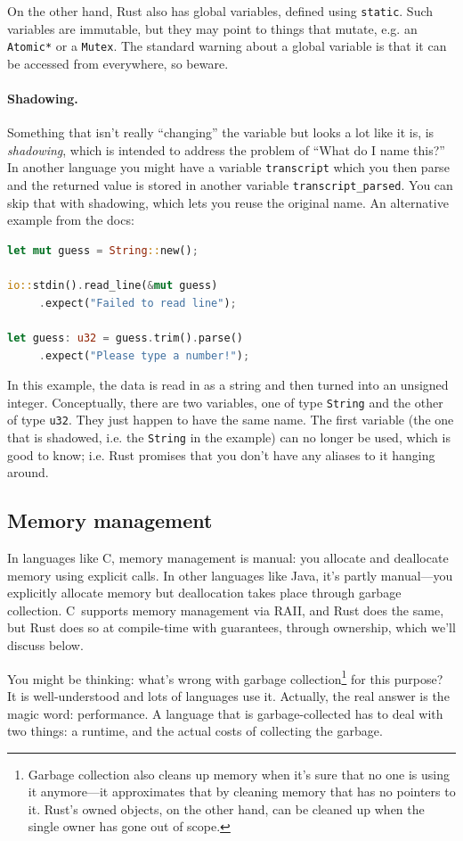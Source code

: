 \documentclass[a4paper]{report}
\newcommand{\CPP}{C\nolinebreak\hspace{-.05em}\raisebox{.4ex}{\tiny\bf +}\nolinebreak\hspace{-.10em}\raisebox{.4ex}{\tiny\bf +}}
\def\CPP{{C\nolinebreak[4]\hspace{-.05em}\raisebox{.4ex}{\tiny\bf ++}}}
\begin{document}
On the other hand, Rust also has global variables, defined using \texttt{static}. Such variables are immutable, but they may point to things that mutate, e.g. an \texttt{Atomic*} or a \texttt{Mutex}. The standard warning about a global variable is that it can be accessed from everywhere, so beware.

\paragraph{Shadowing.}
Something that isn't really ``changing'' the variable but looks a lot like it is, is \textit{shadowing}, which is intended to address the problem of ``What do I name this?'' In another language you might have a variable \texttt{transcript} which you then parse and the returned value is stored in another variable \texttt{transcript\_parsed}. You can skip that with shadowing, which lets you reuse the original name. An alternative example from the docs:

\begin{lstlisting}[language=Rust]
let mut guess = String::new();

io::stdin().read_line(&mut guess)
     .expect("Failed to read line");

let guess: u32 = guess.trim().parse()
     .expect("Please type a number!");
\end{lstlisting}

In this example, the data is read in as a string and then turned into an unsigned integer. Conceptually, there are two variables, one of type \texttt{String} and the other of type \texttt{u32}. They just happen to have the same name. The first variable (the one that is shadowed, i.e. the \texttt{String} in the example) can no longer be used, which is good to know; i.e. Rust promises that you don't have any aliases to it hanging around.

\subsection*{Memory management}
In languages like C, memory management is manual: you allocate and deallocate memory using explicit calls. In other languages like Java, it's partly manual---you explicitly allocate memory but deallocation takes place through garbage collection. \CPP~supports memory management via RAII, and Rust does the same, but Rust does so at compile-time with guarantees, through ownership, which we'll discuss below.

You might be thinking: what's wrong with garbage collection\footnote{Garbage collection also cleans up memory when it's sure that no one is using it anymore---it approximates that by cleaning memory that has no pointers to it. Rust's owned objects, on the other hand, can be cleaned up when the single owner has gone out of scope.} for this purpose? It is well-understood and lots of languages use it. Actually, the real answer is the magic word: performance. A language that is garbage-collected has to deal with two things: a runtime, and the actual costs of collecting the garbage.
\end{document}
